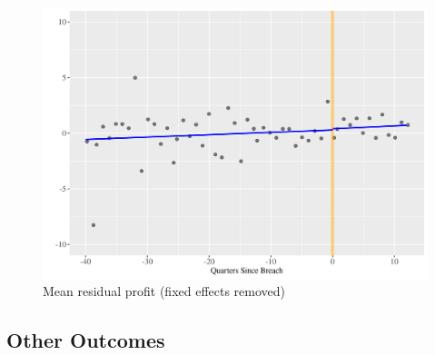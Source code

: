\documentclass[../Main.tex]{subfiles}
\begin{document}
\FloatBarrier
\clearpage

\begin{figure}
    \centering
    \caption{Mean residual profit (fixed effects removed)}
    \label{prfig}
    \includegraphics[width=\textwidth]{Images/mean_resid_profit_3y.png}
\end{figure}

\FloatBarrier
\clearpage

\subsection{Other Outcomes}
\end{document}
